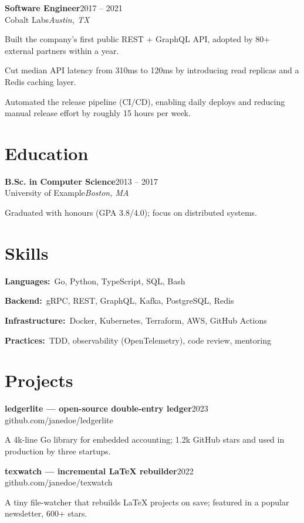 \documentclass[a4paper,11pt]{article}
\newcommand{\entry}[4]{%
  \par\smallskip
  \noindent\textbf{#1}\hfill{\color{textgrey}\small #2}\\[1pt]
  {\color{accent}\small #3}\hfill{\color{textgrey}\small\itshape #4}\par
}
\newcommand{\skillline}[2]{%
  \noindent\textbf{#1:}~{#2}\par\smallskip%
}
\begin{document}
\entry{Software Engineer}{2017 -- 2021}{Cobalt Labs}{Austin, TX}
\begin{points}
  \item Built the company's first public REST + GraphQL API, adopted by 80+
        external partners within a year.
  \item Cut median API latency from 310ms to 120ms by introducing read
        replicas and a Redis caching layer.
  \item Automated the release pipeline (CI/CD), enabling daily deploys and
        reducing manual release effort by roughly 15 hours per week.
\end{points}

\section{Education}
\entry{B.Sc. in Computer Science}{2013 -- 2017}{University of Example}{Boston, MA}
\begin{points}
  \item Graduated with honours (GPA 3.8/4.0); focus on distributed systems.
\end{points}

\section{Skills}
\skillline{Languages}{Go, Python, TypeScript, SQL, Bash}
\skillline{Backend}{gRPC, REST, GraphQL, Kafka, PostgreSQL, Redis}
\skillline{Infrastructure}{Docker, Kubernetes, Terraform, AWS, GitHub Actions}
\skillline{Practices}{TDD, observability (OpenTelemetry), code review, mentoring}

\section{Projects}
\entry{ledgerlite — open-source double-entry ledger}{2023}{github.com/janedoe/ledgerlite}{}
\begin{points}
  \item A 4k-line Go library for embedded accounting; 1.2k GitHub stars and
        used in production by three startups.
\end{points}

\entry{texwatch — incremental LaTeX rebuilder}{2022}{github.com/janedoe/texwatch}{}
\begin{points}
  \item A tiny file-watcher that rebuilds LaTeX projects on save; featured in a
        popular newsletter, 600+ stars.
\end{points}
\end{document}
